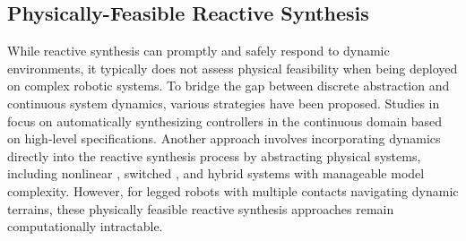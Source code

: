 
\subsection{Physically-Feasible Reactive Synthesis}



While reactive synthesis can promptly and safely respond to dynamic environments, it typically does not assess physical feasibility when being deployed on complex robotic systems. To bridge the gap between discrete abstraction and continuous system dynamics, various strategies have been proposed. Studies in  \citep{decastro2014dynamics,fainekos2006translating} focus on automatically synthesizing controllers in the continuous domain based on high-level specifications. Another approach involves incorporating dynamics directly into the reactive synthesis process by abstracting physical systems, including nonlinear \citep{bhatia2010sampling}, switched \citep{liu2013synthesis}, and hybrid systems \citep{maly2013iterative} with manageable model complexity. However, for legged robots with multiple contacts navigating dynamic terrains, these physically feasible reactive synthesis approaches remain computationally intractable.

